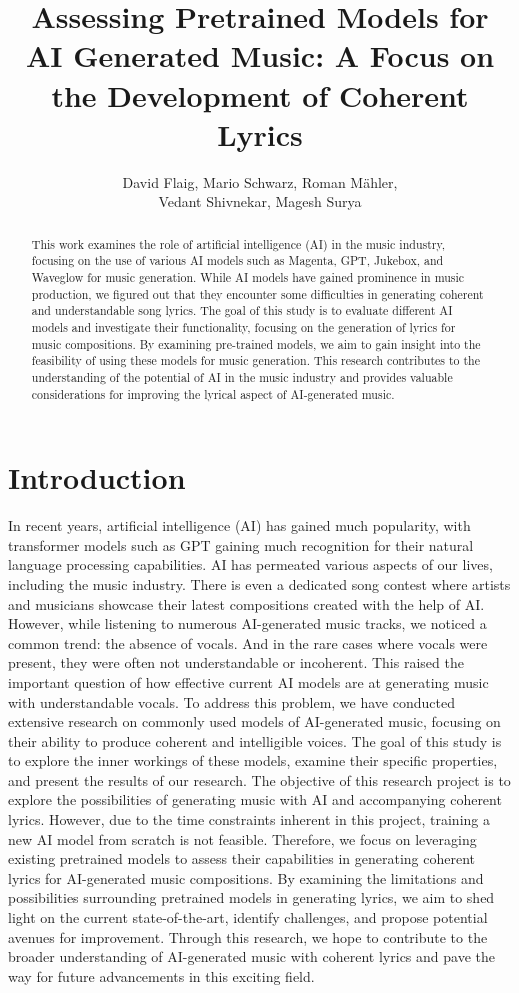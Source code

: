 \documentclass{article}
\title{Assessing Pretrained Models for AI Generated Music: A Focus on the Development of Coherent Lyrics}
\author{David Flaig, Mario Schwarz, Roman Mähler,\\ Vedant Shivnekar, Magesh Surya}
\begin{document}
\maketitle

\begin{abstract}
    This work examines the role of artificial intelligence (AI) in the music industry, focusing on the use of various AI models such as Magenta, GPT, Jukebox, and Waveglow for music generation. While AI models have gained prominence in music production, we figured out that they encounter some difficulties in generating coherent and understandable song lyrics. The goal of this study is to evaluate different AI models and investigate their functionality, focusing on the generation of lyrics for music compositions. By examining pre-trained models, we aim to gain insight into the feasibility of using these models for music generation. This research contributes to the understanding of the potential of AI in the music industry and provides valuable considerations for improving the lyrical aspect of AI-generated music.
\end{abstract}

\section{Introduction}
In recent years, artificial intelligence (AI) has gained much popularity, with transformer models such as GPT gaining much recognition for their natural language processing capabilities. AI has permeated various aspects of our lives, including the music industry. There is even a dedicated song contest where artists and musicians showcase their latest compositions created with the help of AI.
However, while listening to numerous AI-generated music tracks, we noticed a common trend: the absence of vocals. And in the rare cases where vocals were present, they were often not understandable or incoherent. This raised the important question of how effective current AI models are at generating music with understandable vocals.
To address this problem, we have conducted extensive research on commonly used models of AI-generated music, focusing on their ability to produce coherent and intelligible voices. The goal of this study is to explore the inner workings of these models, examine their specific properties, and present the results of our research.
The objective of this research project is to explore the possibilities of generating music with AI and accompanying coherent lyrics. However, due to the time constraints inherent in this project, training a new AI model from scratch is not feasible. Therefore, we focus on leveraging existing pretrained models to assess their capabilities in generating coherent lyrics for AI-generated music compositions. 
By examining the limitations and possibilities surrounding pretrained models in generating lyrics, we aim to shed light on the current state-of-the-art, identify challenges, and propose potential avenues for improvement. Through this research, we hope to contribute to the broader understanding of AI-generated music with coherent lyrics and pave the way for future advancements in this exciting field.
\end{document}
